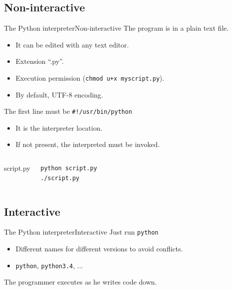 \documentclass[10pt,compress]{beamer} %
\begin{document}
\subsection{Non-interactive}
\begin{frame}[fragile]{The Python interpreter}{Non-interactive}
	The program is in a plain text file.
		\begin{itemize}
		\item It can be edited with any text editor.
		\item Extension ``.py''.
		\item Execution permission (\texttt{chmod u+x myscript.py}).
		\item By default, UTF-8 encoding.
		\end{itemize}
	The first line must be \texttt{\#!/usr/bin/python}
		\begin{itemize}
		\item It is the interpreter location.
		\item If not present, the interpreted must be invoked.
		\end{itemize}

    \begin{columns}
	
		\vspace{-0.2cm}
		\begin{block}{script.py}
		\vspace{-0.2cm}
			
		\end{block}

    	\begin{block}{}
\begin{verbatim}
python script.py
./script.py
\end{verbatim}
		\end{block}
	\end{columns}
\end{frame}

\subsection{Interactive}
\begin{frame}{The Python interpreter}{Interactive}
		Just run \texttt{python}
			\begin{itemize}
				\item Different names for different versions to avoid conflicts.
				\item \texttt{python}, \texttt{python3.4}, ...
			\end{itemize}

		\vspace{-0.2cm}
		\begin{block}{}
		\vspace{-0.2cm}
			
		\end{block}
		The programmer executes as he writes code down.
\end{frame}
\end{document}
